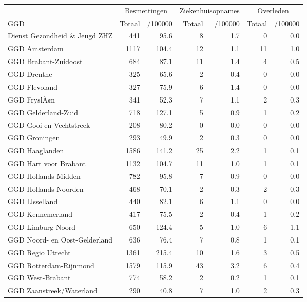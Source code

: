 \documentclass[
  english,
  man,floatsintext]{apa6}
\begin{document}
\begin{table}
\centering\begingroup\fontsize{10}{12}\selectfont

\begin{threeparttable}
\begin{tabular}{lrrrrrr}
\toprule
\multicolumn{1}{c}{ } & \multicolumn{2}{c}{Besmettingen} & \multicolumn{2}{c}{Ziekenhuisopnames} & \multicolumn{2}{c}{Overleden} \\
\cmidrule(l{3pt}r{3pt}){2-3} \cmidrule(l{3pt}r{3pt}){4-5} \cmidrule(l{3pt}r{3pt}){6-7}
GGD & Totaal & /100000 & Totaal & /100000 & Totaal & /100000\\
\midrule
Dienst Gezondheid \& Jeugd ZHZ & 441 & 95.6 & 8 & 1.7 & 0 & 0.0\\
GGD Amsterdam & 1117 & 104.4 & 12 & 1.1 & 11 & 1.0\\
GGD Brabant-Zuidoost & 684 & 87.1 & 11 & 1.4 & 4 & 0.5\\
GGD Drenthe & 325 & 65.6 & 2 & 0.4 & 0 & 0.0\\
GGD Flevoland & 327 & 75.9 & 6 & 1.4 & 0 & 0.0\\
GGD FryslÃ¢n & 341 & 52.3 & 7 & 1.1 & 2 & 0.3\\
GGD Gelderland-Zuid & 718 & 127.1 & 5 & 0.9 & 1 & 0.2\\
GGD Gooi en Vechtstreek & 208 & 80.2 & 0 & 0.0 & 0 & 0.0\\
GGD Groningen & 293 & 49.9 & 2 & 0.3 & 0 & 0.0\\
GGD Haaglanden & 1586 & 141.2 & 25 & 2.2 & 1 & 0.1\\
GGD Hart voor Brabant & 1132 & 104.7 & 11 & 1.0 & 1 & 0.1\\
GGD Hollands-Midden & 782 & 95.8 & 7 & 0.9 & 0 & 0.0\\
GGD Hollands-Noorden & 468 & 70.1 & 2 & 0.3 & 2 & 0.3\\
GGD IJsselland & 440 & 82.1 & 6 & 1.1 & 0 & 0.0\\
GGD Kennemerland & 417 & 75.5 & 2 & 0.4 & 1 & 0.2\\
GGD Limburg-Noord & 650 & 124.4 & 5 & 1.0 & 6 & 1.1\\
GGD Noord- en Oost-Gelderland & 636 & 76.4 & 7 & 0.8 & 1 & 0.1\\
GGD Regio Utrecht & 1361 & 215.4 & 10 & 1.6 & 3 & 0.5\\
GGD Rotterdam-Rijnmond & 1579 & 115.9 & 43 & 3.2 & 6 & 0.4\\
GGD West-Brabant & 774 & 58.2 & 2 & 0.2 & 1 & 0.1\\
GGD Zaanstreek/Waterland & 290 & 40.8 & 7 & 1.0 & 2 & 0.3\\

\end{tabular}
\end{threeparttable}
\end{table}
\end{document}
